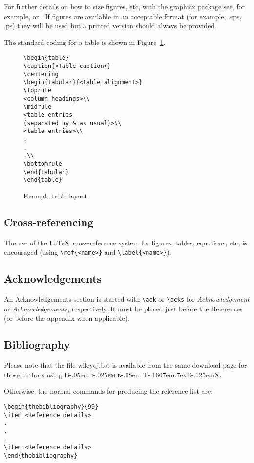 \documentclass[times]{qjrms4}
\newcommand\BibTeX{{\rmfamily B\kern-.05em \textsc{i\kern-.025em b}\kern-.08em
T\kern-.1667em\lower.7ex\hbox{E}\kern-.125emX}}
\begin{document}
For further details on how to size figures, etc, with the
\textsf{graphicx} package see, for example, \cite{R1} or
\cite{R3}. If figures are available in an acceptable format (for
example, .eps, .ps) they will be used but a printed version should
always be provided. \medbreak

The standard coding for a table is shown in Figure~\ref{F2}.

\begin{figure}
\begin{verbatim}
\begin{table}
\caption{<Table caption>}
\centering
\begin{tabular}{<table alignment>}
\toprule
<column headings>\\
\midrule
<table entries
(separated by & as usual)>\\
<table entries>\\
.
.
.\\
\bottomrule
\end{tabular}
\end{table}
\end{verbatim}
\caption{Example table layout.\label{F2}}
\end{figure}

\subsection{Cross-referencing}
The use of the \LaTeX\ cross-reference system
for figures, tables, equations, etc, is encouraged
(using \verb"\ref{<name>}" and \verb"\label{<name>}").

\subsection{Acknowledgements}
An Acknowledgements section is started with \verb"\ack" or
\verb"\acks" for \textit{Acknowledgement} or
\textit{Acknowledgements}, respectively. It must be placed just
before the References (or before the appendix when applicable).

\subsection{Bibliography}
Please note that the file \textsf{wileyqj.bst} is available from
the same download page for those authors using \BibTeX.

Otherwise, the normal commands for producing the reference list
are:
\begin{verbatim}
\begin{thebibliography}{99}
\item <Reference details>
.
.
.
\item <Reference details>
\end{thebibliography}
\end{verbatim}
\end{document}
